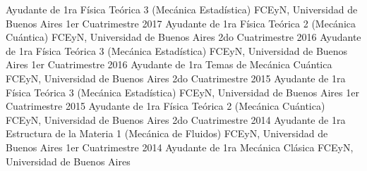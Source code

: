 
\begin{cventries}

  \cventry
    {Ayudante de 1ra} %
    {Física Teórica 3 (Mecánica Estadística)} %
    {FCEyN, Universidad de Buenos Aires} %
    {1er Cuatrimestre 2017} %
    {
    }
    \vspace{-.4cm}
  \cventry
    {Ayudante de 1ra} %
    {Física Teórica 2 (Mecánica Cuántica)} %
    {FCEyN, Universidad de Buenos Aires} %
    {2do Cuatrimestre 2016} %
    {
    }
    \vspace{-.4cm}
  \cventry
    {Ayudante de 1ra} %
    {Física Teórica 3 (Mecánica Estadística)} %
    {FCEyN, Universidad de Buenos Aires} %
    {1er Cuatrimestre 2016} %
    {
    }
    \vspace{-.4cm}
  \cventry
    {Ayudante de 1ra} %
    {Temas de Mecánica Cuántica} %
    {FCEyN, Universidad de Buenos Aires} %
    {2do Cuatrimestre 2015} %
    {
    }
    \vspace{-.4cm}
  \cventry
    {Ayudante de 1ra} %
    {Física Teórica 3 (Mecánica Estadística)} %
    {FCEyN, Universidad de Buenos Aires} %
    {1er Cuatrimestre 2015} %
    {
    }
    \vspace{-.4cm}
  \cventry
    {Ayudante de 1ra} %
    {Física Teórica 2 (Mecánica Cuántica)} %
    {FCEyN, Universidad de Buenos Aires} %
    {2do Cuatrimestre 2014} %
    {
    }
    \vspace{-.4cm}
  \cventry
    {Ayudante de 1ra} %
    {Estructura de la Materia 1 (Mecánica de Fluidos)} %
    {FCEyN, Universidad de Buenos Aires} %
    {1er Cuatrimestre 2014} %
    {
    }
    \vspace{-.4cm}
  \cventry
    {Ayudante de 1ra} %
    {Mecánica Clásica} %
    {FCEyN, Universidad de Buenos Aires} %

\end{cventries}
